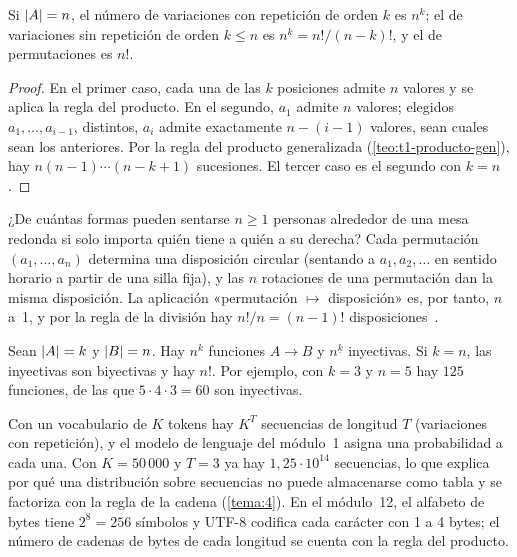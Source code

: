 \begin{teorema}\label{teo:t1-variaciones}
Si $\lvert A\rvert=n$, el número de variaciones con repetición de orden $k$ es $n^{k}$; el de variaciones sin repetición de orden $k\le n$ es $n^{\underline{k}}=n!/(n-k)!$, y el de permutaciones es $n!$.
\end{teorema}

\begin{proof}
En el primer caso, cada una de las $k$ posiciones admite $n$ valores y se aplica la regla del producto. En el segundo, $a_1$ admite $n$ valores; elegidos $a_1,\dots,a_{i-1}$, distintos, $a_i$ admite exactamente $n-(i-1)$ valores, sean cuales sean los anteriores. Por la regla del producto generalizada (\cref{teo:t1-producto-gen}), hay $n(n-1)\cdots(n-k+1)$ sucesiones. El tercer caso es el segundo con $k=n$.
\end{proof}

\begin{ejemplo}\label{ej:t1-circular}
¿De cuántas formas pueden sentarse $n\ge1$ personas alrededor de una mesa redonda si solo importa quién tiene a quién a su derecha? Cada permutación $(a_1,\dots,a_n)$ determina una disposición circular (sentando a $a_1,a_2,\dots$ en sentido horario a partir de una silla fija), y las $n$ rotaciones de una permutación dan la misma disposición. La aplicación «permutación $\mapsto$ disposición» es, por tanto, $n$ a~1, y por la regla de la división hay $n!/n=(n-1)!$ disposiciones~\cite[§14.4.2]{mcs}.
\end{ejemplo}

\begin{ejemplo}
Sean $\lvert A\rvert=k$ y $\lvert B\rvert=n$. Hay $n^{k}$ funciones $A\to B$ y $n^{\underline{k}}$ inyectivas. Si $k=n$, las inyectivas son biyectivas y hay $n!$. Por ejemplo, con $k=3$ y $n=5$ hay $125$ funciones, de las que $5\cdot4\cdot3=60$ son inyectivas.
\end{ejemplo}

\begin{observacion}
Con un vocabulario de $K$ tokens hay $K^{T}$ secuencias de longitud $T$ (variaciones con repetición), y el modelo de lenguaje del módulo~1 asigna una probabilidad a cada una. Con $K=50\,000$ y $T=3$ ya hay $1{,}25\cdot10^{14}$ secuencias, lo que explica por qué una distribución sobre secuencias no puede almacenarse como tabla y se factoriza con la regla de la cadena (\cref{tema:4}). En el módulo~12, el alfabeto de bytes tiene $2^{8}=256$ símbolos y UTF-8 codifica cada carácter con 1 a 4 bytes; el número de cadenas de bytes de cada longitud se cuenta con la regla del producto.
\end{observacion}

